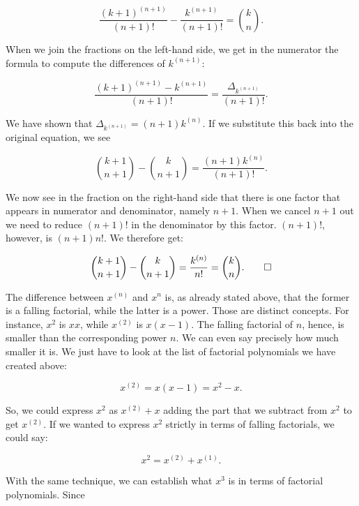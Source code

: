 \documentclass[tikz]{scrreprt}
\begin{document}
\begin{equation}
\frac{(k+1)^{(n+1)}}{(n+1)!} - \frac{k^{(n+1)}}{(n+1)!} = \binom{k}{n}.
\end{equation}

When we join the fractions on the left-hand side,
we get in the numerator the formula to compute 
the differences of $k^{(n+1)}$:

\[
\frac{(k+1)^{(n+1)} - k^{(n+1)}}{(n+1)!} =
\frac{\Delta_{k^{(n+1)}}}{(n+1)!}.
\]

We have shown that $\Delta_{k^{(n+1)}} = (n+1)k^{(n)}$.
If we substitute this back into the original equation,
we see

\begin{equation}
\binom{k+1}{n+1} - \binom{k}{n+1} =
\frac{(n+1){k^{(n)}}}{(n+1)!}.
\end{equation}

We now see in the fraction on the right-hand side 
that there is one factor
that appears in numerator and denominator,
namely $n+1$. When we cancel $n+1$ out
we need to
reduce $(n+1)!$ in the denominator by this factor.
$(n+1)!$, however, is $(n+1)n!$.
We therefore get:

\begin{equation}
\binom{k+1}{n+1} - \binom{k}{n+1} =
\frac{{k^{(n)}}}{n!} = 
\binom{k}{n}.\qed
\end{equation}

The difference between $x^{(n)}$ and $x^n$ is,
as already stated above, that the former is
a falling factorial, while the latter is
a power. Those are distinct concepts.
For instance, $x^2$ is $xx$, while
$x^{(2)}$ is $x(x-1)$. The falling factorial of $n$,
hence, is smaller than the corresponding power $n$.
We can even say precisely how much smaller it is.
We just have to look at the list of factorial
polynomials we have created above:

\begin{equation}
x^{(2)} = x(x-1) = x^2 - x.
\end{equation}

So, we could express $x^2$ as
$x^{(2)} + x$ adding the part that
we subtract from $x^2$ to get $x^{(2)}$.
If we wanted to express $x^2$ strictly
in terms of falling factorials, we could say: 

\begin{equation}
x^2 = x^{(2)} + x^{(1)}.
\end{equation}

With the same technique, we can establish 
what $x^3$ is in terms of factorial polynomials.
Since
\end{document}
